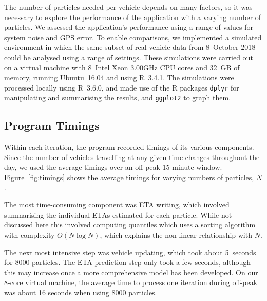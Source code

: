The number of particles needed per vehicle 
depends on many factors,
so it was necessary to explore the performance of the application
with a varying number of particles.
We assessed the application's performance
using a range of values for
system noise and GPS error.
To enable comparisons, we implemented a simulated \rt environment
in which the same subset of real vehicle data from 8~October 2018
could be analysed using a range of settings.
These simulations were carried out on a virtual machine 
with 8~Intel Xeon 3.00GHz CPU cores and 32~GB of memory, 
running Ubuntu~16.04 and using R~3.4.1.
The simulations were processed locally using R~3.6.0,
and made use of the R packages \verb+dplyr+ \citep{dplyr}
for manipulating and summarising the results,
and \verb+ggplot2+ \citep{ggplot2} to graph them.


\subsection{Program Timings}
\label{sec:timings}

Within each iteration, the program recorded timings of its various components.
Since the number of vehicles travelling at any given time changes throughout the day,
we used the average timings over an off-peak 15-minute window.
Figure~\ref{fig:timings} shows the average timings for 
varying numbers of particles, $N$.


The most time-consuming component was ETA writing,
which involved summarising the individual ETAs estimated for each particle.
While not discussed here this involved computing quantiles which uses a sorting algorithm
with complexity $O(N \log N)$,
which explains the non-linear relationship with $N$.


The next most intensive step was vehicle updating,
which took about 5~seconds for 8000 particles.
The ETA prediction step only took a few seconds,
although this may increase once a more comprehensive model has been developed.
On our 8-core virtual machine, 
the average time to process one iteration during off-peak 
was about 16 seconds when using 8000 particles.

